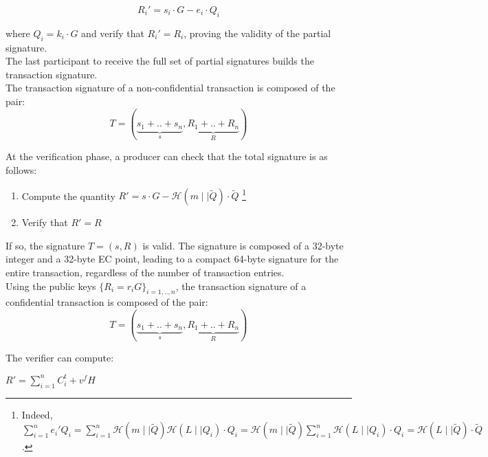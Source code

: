 \begin{equation} 
R_i' = s_{i}\cdot G - e_i\cdot Q_i
\end{equation}

where $Q_i = k_i\cdot G$ and verify that $R_i' = R_i$, proving the validity of the partial signature. \\

The last participant to receive the full set of partial signatures builds the transaction signature.\\

 The transaction signature of a non-confidential transaction is composed of the pair:
\begin{equation} 
T= (\underbrace{s_{1}+..+s_{n}}_{s}, \underbrace{R_{1}+..+R_{n}}_{R})
\end{equation}

At the verification phase, a producer can check that the total signature is as follows:
\begin{enumerate}
\item Compute the quantity $R' = s \cdot G - \mathcal{H}(m \mid\mid \tilde{Q})\cdot \tilde{Q}$ \footnote{Indeed, $\sum_{i=1}^{n}e_i'Q_i =  \sum_{i=1}^{n} \mathcal{H}(m \mid\mid \tilde{Q})\mathcal{H}(L \mid\mid Q_i) \cdot Q_i = \mathcal{H}(m \mid\mid \tilde{Q})  \sum_{i=1}^{n}\mathcal{H}(L \mid\mid Q_i)  \cdot Q_i = \mathcal{H}(L \mid\mid \tilde{Q})\cdot \tilde{Q}$.}
\item Verify that $R'=R$
\end{enumerate}

If so, the signature $T = (s,R)$ is valid. The signature is composed of a 32-byte integer and a 32-byte EC point, leading to a compact 64-byte signature for the entire transaction, regardless of the number of transaction entries. \\

Using the public keys $\{R_i = r_iG\}_{i=1,..,n}$, the transaction signature of a confidential transaction is composed of the pair:
\begin{equation} 
T= (\underbrace{s_{1}+..+s_{n}}_{s}, \underbrace{R_{1}+..+R_{n}}_{R})
\end{equation}

The verifier can compute:
\begin{center}
$R' = \sum_{i=1}^{n}C_i^t + v^fH$
\end{center}

